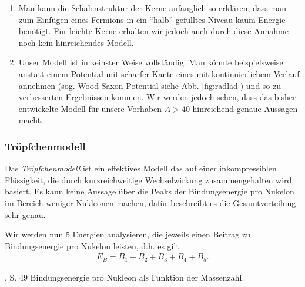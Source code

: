 \begin{bemn}[Bemerkungen.]
\begin{enumerate}[label=\arabic{*}.]
\item Man kann die Schalenstruktur der Kerne anfänglich so erklären, dass man
zum Einfügen eines Fermions in ein ``halb'' gefülltes Niveau kaum Energie
benötigt. Für leichte Kerne erhalten wir jedoch auch durch diese Annahme noch
kein hinreichendes Modell.
\item
Unser Modell ist in keinster Weise vollständig. Man könnte beispielsweise 
anstatt einem Potential mit scharfer Kante eines mit kontinuierlichem Verlauf
annehmen (sog. Wood-Saxon-Potential siehe Abb. \ref{fig:radlad}) und so zu
verbesserten Ergebnissen kommen. Wir werden jedoch sehen, dass das bisher entwickelte Modell für unsere Vorhaben $A>40$ hinreichend
genaue Aussagen macht.\maphere
\end{enumerate}
\end{bemn}

\subsubsection{Tröpfchenmodell}

Das \emph{Tröpfchenmodell} ist ein effektives Modell das auf einer
inkompressiblen Flüssigkeit, die durch kurzreichweitige Wechselwirkung
zusammengehalten wird, basiert. Es kann keine Aussage über die Peaks der
Bindungsenergie pro Nukelon im Bereich weniger Nukleonen machen, dafür
beschreibt es die Gesamtverteilung sehr genau.

Wir werden nun 5 Energien analysieren, die jeweils einen Beitrag zu
Bindungsenergie pro Nukelon leisten, d.h. es gilt
\begin{align*}
E_B = B_1 + B_2 + B_3 + B_4 + B_5.
\end{align*}


	{\BethgeWalter, S. 49}
	{Bindungsenergie pro Nukleon als Funktion der Massenzahl.}
% 	

